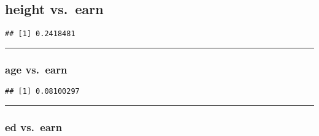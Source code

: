 \documentclass[
]{article}
\newenvironment{Shaded}{\begin{snugshade}}{\end{snugshade}}
\newcommand{\FunctionTok}[1]{\textcolor[rgb]{0.00,0.00,0.00}{#1}}
\newcommand{\NormalTok}[1]{#1}
\newcommand{\SpecialCharTok}[1]{\textcolor[rgb]{0.00,0.00,0.00}{#1}}
\begin{document}
\hypertarget{height-vs.-earn}{%
\subsection{height vs.~earn}\label{height-vs.-earn}}

\begin{Shaded}
\end{Shaded}

\begin{verbatim}
## [1] 0.2418481
\end{verbatim}

\begin{center}\rule{0.5\linewidth}{0.5pt}\end{center}

\hypertarget{age-vs.-earn}{%
\subsubsection{age vs.~earn}\label{age-vs.-earn}}

\begin{Shaded}
\end{Shaded}

\begin{verbatim}
## [1] 0.08100297
\end{verbatim}

\begin{center}\rule{0.5\linewidth}{0.5pt}\end{center}

\hypertarget{ed-vs.-earn}{%
\subsubsection{ed vs.~earn}\label{ed-vs.-earn}}

\begin{Shaded}
\end{Shaded}
\end{document}
